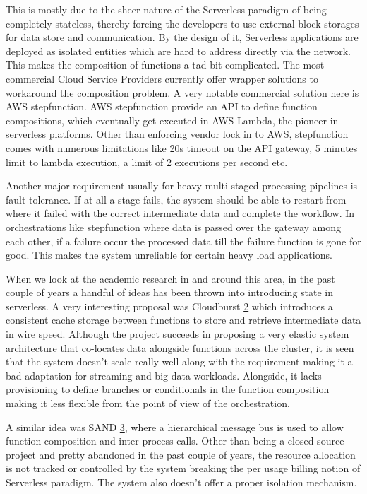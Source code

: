 \documentclass[12pt,titlepage]{article}
\begin{document}
This is mostly due to the sheer
nature of the Serverless paradigm of being completely stateless, thereby forcing
the developers to use external block storages for data store and communication.
By the design of it, Serverless applications are deployed as isolated entities
which are hard to address directly via the network. This makes the composition
of functions a tad bit complicated. The most commercial Cloud Service Providers
currently offer wrapper solutions to workaround the composition problem. A very
notable commercial solution here is AWS stepfunction. AWS stepfunction provide
an API to define function compositions, which eventually get executed in AWS
Lambda, the pioneer in serverless platforms. Other than enforcing vendor lock in
to AWS, stepfunction comes with numerous limitations like 20s timeout on the API
gateway, 5 minutes limit to lambda execution, a limit of 2 executions per second
etc.

Another major requirement usually for heavy multi-staged processing pipelines is fault
tolerance. If at all a stage fails, the system should be able to restart from
where it failed with the correct intermediate data and complete the workflow. In
orchestrations like stepfunction where data is passed over the gateway among
each other, if a failure occur the processed data till the failure function is
gone for good. This makes the system unreliable for certain heavy load applications.

When we look at the academic research in and around this area, in the past
couple of years a handful of ideas has been thrown into introducing state in
serverless. A very interesting proposal was Cloudburst \hyperref[ref:2]{2} which
introduces a consistent cache storage between functions to store and retrieve
intermediate data in wire speed. Although the project succeeds in proposing a
very elastic system architecture that co-locates data alongside functions across
the cluster, it is seen that the system doesn't scale really well along with
the requirement making it a bad adaptation for streaming and big data workloads.
Alongside, it lacks provisioning to define branches or conditionals in the function
composition making it less flexible from the point of view of the orchestration.

A similar idea was SAND \hyperref[ref:3]{3}, where a hierarchical message bus is used to allow
function composition and inter process calls. Other than being a closed source
project and pretty abandoned in the past couple of years, the resource
allocation is not tracked or controlled by the system breaking the per usage
billing notion of Serverless paradigm. The system also doesn't offer a
proper isolation mechanism.
\end{document}
